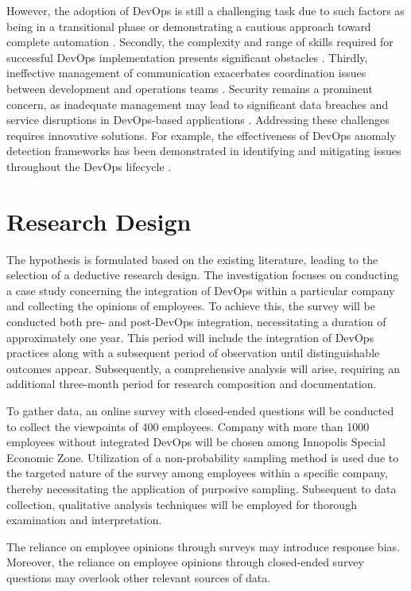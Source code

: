 \documentclass[oneside,final,12pt,a4paper]{extreport}
\begin{document}
\newpage

However, the adoption of DevOps is still a challenging task due to such factors as being in a transitional phase or demonstrating a cautious approach toward complete automation \cite{12}. Secondly, the complexity and range of skills required for successful DevOps implementation presents significant obstacles \cite{7}. Thirdly, ineffective management of communication exacerbates coordination issues between development and operations teams \cite{7}. Security remains a prominent concern, as inadequate management may lead to significant data breaches and service disruptions in DevOps-based applications \cite{14}. Addressing these challenges requires innovative solutions. For example, the effectiveness of DevOps anomaly detection frameworks has been demonstrated in identifying and mitigating issues throughout the DevOps lifecycle \cite{13}.

\section{Research Design}

The hypothesis is formulated based on the existing literature, leading to the selection of a deductive research design. The investigation focuses on conducting a case study concerning the integration of DevOps within a particular company and collecting the opinions of employees. To achieve this, the survey will be conducted both pre- and post-DevOps integration, necessitating a duration of approximately one year. This period will include the integration of DevOps practices along with a subsequent period of observation until distinguishable outcomes appear. Subsequently, a comprehensive analysis will arise, requiring an additional three-month period for research composition and documentation.

To gather data, an online survey with closed-ended questions will be conducted to collect the viewpoints of 400 employees. Company with more than 1000 employees without integrated DevOps will be chosen among Innopolis Special Economic Zone. Utilization of a non-probability sampling method is used due to the targeted nature of the survey among employees within a specific company, thereby necessitating the application of purposive sampling. Subsequent to data collection, qualitative analysis techniques will be employed for thorough examination and interpretation.

\newpage

The reliance on employee opinions through surveys may introduce response bias. Moreover, the reliance on employee opinions through closed-ended survey questions may overlook other relevant sources of data.
\end{document}
